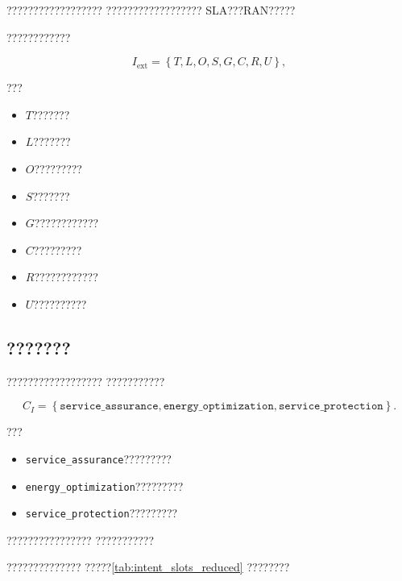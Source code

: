 ??????????????????
??????????????????
SLA???RAN?????

????????????

\begin{equation}
I_{\mathrm{ext}}
=
\left\{
T,L,O,S,G,C,R,U
\right\},
\label{eq:structured_intent_representation}
\end{equation}

???

\begin{itemize}
    \item $T$???????
    \item $L$???????
    \item $O$?????????
    \item $S$???????
    \item $G$????????????
    \item $C$?????????
    \item $R$????????????
    \item $U$??????????
\end{itemize}


\subsection*{???????}

??????????????????
???????????

\begin{equation}
C_I
=
\left\{
\texttt{service\_assurance},
\texttt{energy\_optimization},
\texttt{service\_protection}
\right\}.
\label{eq:intent_type_set}
\end{equation}

???

\begin{itemize}
    \item \texttt{service\_assurance}?????????
    \item \texttt{energy\_optimization}?????????
    \item \texttt{service\_protection}?????????
\end{itemize}

????????????????
???????????

??????????????
?????\ref{tab:intent_slots_reduced}
????????

